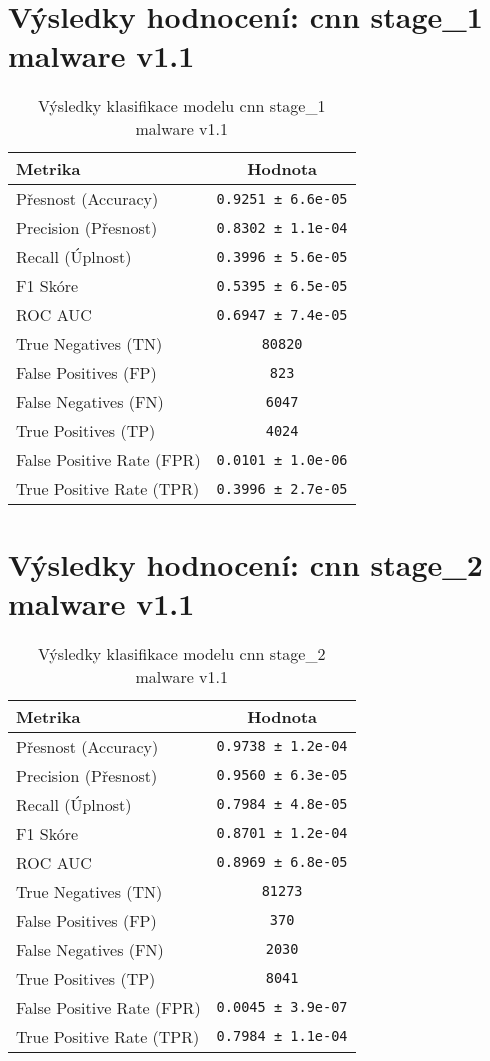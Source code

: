 \section*{Výsledky hodnocení: cnn stage_1 malware v1.1}
\begin{table}[h!]
\centering
\begin{tabular}{|l|c|}
\hline
\textbf{Metrika} & \textbf{Hodnota} \\
\hline
Přesnost (Accuracy) & \texttt{0.9251 ± 6.6e-05} \\
Precision (Přesnost) & \texttt{0.8302 ± 1.1e-04} \\
Recall (Úplnost) & \texttt{0.3996 ± 5.6e-05} \\
F1 Skóre & \texttt{0.5395 ± 6.5e-05} \\
ROC AUC & \texttt{0.6947 ± 7.4e-05} \\
True Negatives (TN) & \texttt{80820} \\
False Positives (FP) & \texttt{823} \\
False Negatives (FN) & \texttt{6047} \\
True Positives (TP) & \texttt{4024} \\
False Positive Rate (FPR) & \texttt{0.0101 ± 1.0e-06} \\
True Positive Rate (TPR) & \texttt{0.3996 ± 2.7e-05} \\
\hline
\end{tabular}
\caption{Výsledky klasifikace modelu cnn stage_1 malware v1.1}
\label{tab:malware_cnn}
\end{table}

\section*{Výsledky hodnocení: cnn stage_2 malware v1.1}
\begin{table}[h!]
\centering
\begin{tabular}{|l|c|}
\hline
\textbf{Metrika} & \textbf{Hodnota} \\
\hline
Přesnost (Accuracy) & \texttt{0.9738 ± 1.2e-04} \\
Precision (Přesnost) & \texttt{0.9560 ± 6.3e-05} \\
Recall (Úplnost) & \texttt{0.7984 ± 4.8e-05} \\
F1 Skóre & \texttt{0.8701 ± 1.2e-04} \\
ROC AUC & \texttt{0.8969 ± 6.8e-05} \\
True Negatives (TN) & \texttt{81273} \\
False Positives (FP) & \texttt{370} \\
False Negatives (FN) & \texttt{2030} \\
True Positives (TP) & \texttt{8041} \\
False Positive Rate (FPR) & \texttt{0.0045 ± 3.9e-07} \\
True Positive Rate (TPR) & \texttt{0.7984 ± 1.1e-04} \\
\hline
\end{tabular}
\caption{Výsledky klasifikace modelu cnn stage_2 malware v1.1}
\label{tab:malware_cnn}
\end{table}

